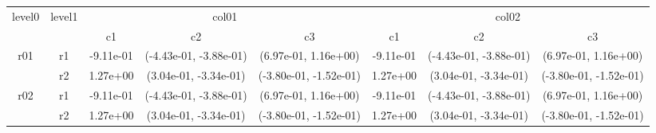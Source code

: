 \begin{tabular}{cccccccc}
\toprule
\multirow{2}{*}{level0} & \multirow{2}{*}{level1}&\multicolumn{3}{c}{col01}&\multicolumn{3}{c}{col02}\tabularnewline
\cmidrule(lr){3-5}
\cmidrule(lr){6-8}
&&c1&c2&c3&c1&c2&c3\tabularnewline
\midrule
\midrule
\multirow{2}{*}{r01}&r1&-9.11e-01& (-4.43e-01, -3.88e-01)& (6.97e-01, 1.16e+00)&-9.11e-01& (-4.43e-01, -3.88e-01)& (6.97e-01, 1.16e+00)\tabularnewline
&r2&1.27e+00& (3.04e-01, -3.34e-01)& (-3.80e-01, -1.52e-01)&1.27e+00& (3.04e-01, -3.34e-01)& (-3.80e-01, -1.52e-01)\tabularnewline
\midrule
\multirow{2}{*}{r02}&r1&-9.11e-01& (-4.43e-01, -3.88e-01)& (6.97e-01, 1.16e+00)&-9.11e-01& (-4.43e-01, -3.88e-01)& (6.97e-01, 1.16e+00)\tabularnewline
&r2&1.27e+00& (3.04e-01, -3.34e-01)& (-3.80e-01, -1.52e-01)&1.27e+00& (3.04e-01, -3.34e-01)& (-3.80e-01, -1.52e-01)\tabularnewline
\bottomrule
\end{tabular}
